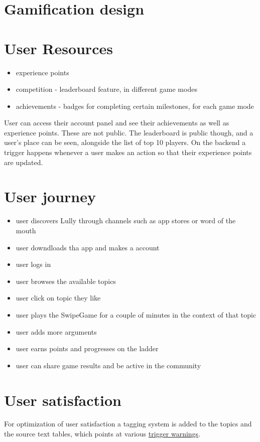 \documentclass{article}
\begin{document}
\section{Gamification design}
\section{User Resources}
\begin{itemize}
  \item experience points 
  \item competition - leaderboard feature, in different game modes
  \item achievements - badges for completing certain milestones, for each game mode
\end{itemize}

User can access their account panel and see their achievements as well as experience points. These are not public. The leaderboard is public though, and a user's place can be seen, alongside the list of top 10 players. On the backend a trigger happens whenever a user makes an action so that their experience points are updated.

\section{User journey}
\begin{itemize}
  \item user discovers Lully through channels such as app stores or word of the mouth
  \item user downdloads tha app and makes a account
  \item user logs in
  \item user browses the available topics
  \item user click on topic they like
  \item user plays the SwipeGame for a couple of minutes in the context of that topic
  \item user adds more arguments
  \item user earns points and progresses on the ladder
  \item user can share game results and be active in the community
\end{itemize}

\section{User satisfaction}
For optimization of user satisfaction a tagging system is added to the topics and the source text tables, which points at various \href{https://adancewithbooks.wordpress.com/2019/09/22/a-small-list-of-trigger-warnings-you-can-use/}{trigger warnings}.
\newpage
\end{document}
